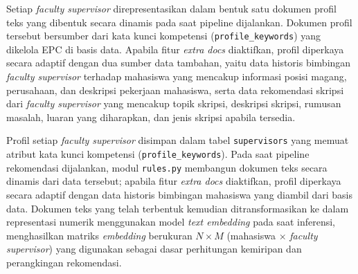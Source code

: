 Setiap \textit{faculty supervisor} direpresentasikan dalam bentuk satu dokumen profil teks yang dibentuk secara dinamis pada saat pipeline dijalankan. Dokumen profil tersebut bersumber dari kata kunci kompetensi (\texttt{profile\_keywords}) yang dikelola EPC di basis data. Apabila fitur \textit{extra docs} diaktifkan, profil diperkaya secara adaptif dengan dua sumber data tambahan, yaitu data historis bimbingan \textit{faculty supervisor} terhadap mahasiswa yang mencakup informasi posisi magang, perusahaan, dan deskripsi pekerjaan mahasiswa, serta data rekomendasi skripsi dari \textit{faculty supervisor} yang mencakup topik skripsi, deskripsi skripsi, rumusan masalah, luaran yang diharapkan, dan jenis skripsi apabila tersedia.

Profil setiap \textit{faculty supervisor} disimpan dalam tabel \texttt{supervisors} yang memuat atribut kata kunci kompetensi (\texttt{profile\_keywords}). Pada saat pipeline rekomendasi dijalankan, modul \texttt{rules.py} membangun dokumen teks secara dinamis dari data tersebut; apabila fitur \textit{extra docs} diaktifkan, profil diperkaya secara adaptif dengan data historis bimbingan mahasiswa yang diambil dari basis data. Dokumen teks yang telah terbentuk kemudian ditransformasikan ke dalam representasi numerik menggunakan model \textit{text embedding} pada saat inferensi, menghasilkan matriks \textit{embedding} berukuran $N \times M$ (mahasiswa $\times$ \textit{faculty supervisor}) yang digunakan sebagai dasar perhitungan kemiripan dan perangkingan rekomendasi.

